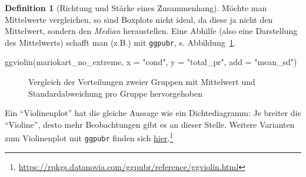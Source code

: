 \documentclass[
  a4paper,
  DIV=11]{scrreprt}
\newenvironment{Shaded}{\begin{snugshade}}{\end{snugshade}}
\newcommand{\AttributeTok}[1]{\textcolor[rgb]{0.40,0.45,0.13}{#1}}
\newcommand{\FunctionTok}[1]{\textcolor[rgb]{0.28,0.35,0.67}{#1}}
\newcommand{\NormalTok}[1]{\textcolor[rgb]{0.00,0.23,0.31}{#1}}
\newcommand{\StringTok}[1]{\textcolor[rgb]{0.13,0.47,0.30}{#1}}
\theoremstyle{definition}
\theoremstyle{definition}
\theoremstyle{definition}
\newtheorem{definition}{Definition}[chapter]
\theoremstyle{remark}
\begin{document}
\begin{definition}[Richtung und Stärke eines
Zusammenhang]
Möchte man Mittelwerte vergleichen, so sind Boxplots nicht ideal, da
diese ja nicht den Mittelwert, sondern den \emph{Median} heraustellen.
Eine Abhilfe (also eine Darstellung des Mittelwerts) schafft man (z.B.)
mit \texttt{ggpubr}, s. Abbildung~\ref{fig-comp-means-ggpubr}.

\begin{Shaded}
\begin{Highlighting}[]
\FunctionTok{ggviolin}\NormalTok{(mariokart\_no\_extreme, }
         \AttributeTok{x =} \StringTok{"cond"}\NormalTok{, }
         \AttributeTok{y =} \StringTok{"total\_pr"}\NormalTok{,}
         \AttributeTok{add =} \StringTok{"mean\_sd"}\NormalTok{) }
\end{Highlighting}
\end{Shaded}

\begin{figure}[H]


\caption{\label{fig-comp-means-ggpubr}Vergleich der Verteilungen zweier
Gruppen mit Mittelwert und Standardabweichung pro Gruppe hervorgehoben}

\end{figure}%

Ein ``Violinenplot'' hat die gleiche Aussage wie ein Dichtediagramm: Je
breiter die ``Violine'', desto mehr Beobachtungen gibt es an dieser
Stelle. Weitere Varianten zum Violinenplot mit \texttt{ggpubr} finden
sich
\href{https://rpkgs.datanovia.com/ggpubr/reference/ggviolin.html}{hier}.\footnote{\url{https://rpkgs.datanovia.com/ggpubr/reference/ggviolin.html}}


\end{definition}
\end{document}

